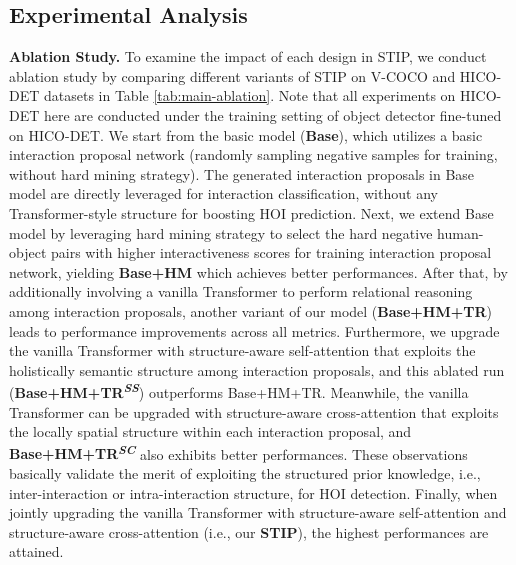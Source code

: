 \documentclass[10pt,twocolumn,letterpaper]{article}
\begin{document}
\subsection{Experimental Analysis}
\textbf{Ablation Study.}
To examine the impact of each design in STIP, we conduct ablation study by comparing different variants of STIP on V-COCO and HICO-DET datasets in Table \ref{tab:main-ablation}. Note that all experiments on HICO-DET here are conducted under the training setting of object detector fine-tuned on HICO-DET. We start from the basic model (\textbf{Base}), which utilizes a basic interaction proposal network (randomly sampling negative samples for training, without hard mining strategy). The generated interaction proposals in Base model are directly leveraged for interaction classification, without any Transformer-style structure for boosting HOI prediction. Next, we extend Base model by leveraging hard mining strategy to select the hard negative human-object pairs with higher interactiveness scores for training interaction proposal network, yielding \textbf{Base+HM} which achieves better performances. After that, by additionally involving a vanilla Transformer to perform relational reasoning among interaction proposals, another variant of our model (\textbf{Base+HM+TR}) leads to performance improvements across all metrics. Furthermore, we upgrade the vanilla Transformer with structure-aware self-attention that exploits the holistically semantic structure among interaction proposals, and this ablated run (\textbf{Base+HM+TR\textsuperscript{\emph{SS}}}) outperforms Base+HM+TR. Meanwhile, the vanilla Transformer can be upgraded with structure-aware cross-attention that exploits the locally spatial structure within each interaction proposal, and \textbf{Base+HM+TR\textsuperscript{\emph{SC}}} also exhibits better performances. These observations basically validate the merit of exploiting the structured prior knowledge, i.e., inter-interaction or intra-interaction structure, for HOI detection. Finally, when jointly upgrading the vanilla Transformer with structure-aware self-attention and structure-aware cross-attention (i.e., our \textbf{STIP}), the highest performances are attained.
\end{document}

